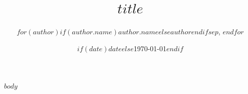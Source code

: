 \documentclass[11pt]{article}
\title{$title$}
\author{$for(author)$$if(author.name)$$author.name$$else$$author$$endif$$sep$, $endfor$}
\date{$if(date)$$date$$else$\today$endif$}
\begin{document}
\maketitle

$body$
\end{document}
